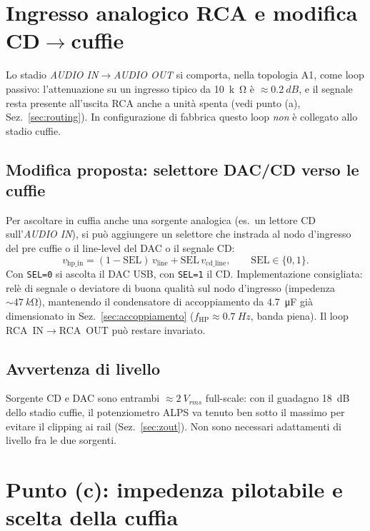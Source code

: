 \section{Ingresso analogico RCA e modifica CD\texorpdfstring{$\rightarrow$}{->}cuffie}\label{sec:ingresso}
Lo stadio \emph{AUDIO IN}$\rightarrow$\emph{AUDIO OUT} si comporta, nella
topologia A1, come loop passivo: l'attenuazione su un ingresso tipico da
\SI{10}{k\ohm} è $\approx\SI{0.2}{dB}$, e il segnale resta presente
all'uscita RCA anche a unità spenta (vedi punto (a),
Sez.~\ref{sec:routing}). In configurazione di fabbrica questo loop
\emph{non} è collegato allo stadio cuffie.

\subsection{Modifica proposta: selettore DAC/CD verso le cuffie}
Per ascoltare in cuffia anche una sorgente analogica (es.\ un lettore CD
sull'\emph{AUDIO IN}), si può aggiungere un selettore che instrada al
nodo d'ingresso del pre cuffie o il line-level del DAC o il segnale CD:
\begin{equation}
  v_{\text{hp\_in}}=(1-\text{SEL})\,v_{\text{line}}+\text{SEL}\,v_{\text{cd\_line}},
  \qquad \text{SEL}\in\{0,1\}.
\end{equation}
Con \texttt{SEL=0} si ascolta il DAC USB, con \texttt{SEL=1} il CD.
Implementazione consigliata: relè di segnale o deviatore di buona qualità
sul nodo d'ingresso (impedenza $\sim\SI{47}{k\ohm}$), mantenendo il
condensatore di accoppiamento da \SI{4.7}{\micro\farad} già dimensionato
in Sez.~\ref{sec:accoppiamento} ($f_{\text{HP}}\approx\SI{0.7}{Hz}$, banda
piena). Il loop RCA~IN$\rightarrow$RCA~OUT può restare invariato.

\subsection{Avvertenza di livello}
Sorgente CD e DAC sono entrambi $\approx\SI{2}{V_{rms}}$ full-scale: con
il guadagno \SI{18}{dB} dello stadio cuffie, il potenziometro ALPS va
tenuto ben sotto il massimo per evitare il clipping ai rail
(Sez.~\ref{sec:zout}). Non sono necessari adattamenti di livello fra le
due sorgenti.

\section{Punto (c): impedenza pilotabile e scelta della cuffia}\label{sec:cuffie}

